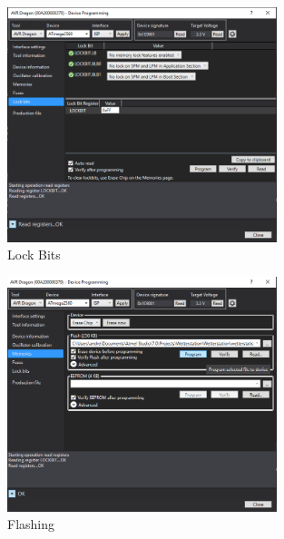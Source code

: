 \begin{figure}[h]
\centering
\includegraphics[width=0.7\textwidth]{../../../graphics/device_programming/4.PNG}
\caption{Lock Bits}
\label{fig:lockbits}
\end{figure}
\begin{figure}[h]
\centering
\includegraphics[width=0.7\textwidth]{../../../graphics/device_programming/5.PNG}
\caption{Flashing}
\label{fig:flashing}
\end{figure}
